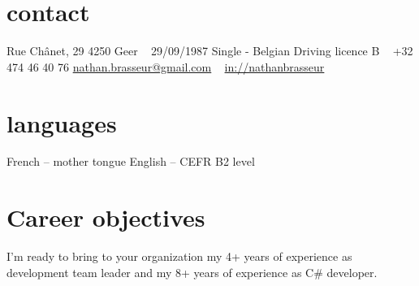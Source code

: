 \documentclass[a4paper]{cv-friggeri-x}
\begin{document}
%
%
%
\begin{aside} %
\section{contact}
\hfill Rue Chânet, 29
4250 Geer
~
29/09/1987
Single - Belgian
Driving licence B
~
\hfill +32 474 46 40 76
\hfill \href{mailto:nathan.brasseur@gmail.com}{nathan.brasseur@gmail.com}
~
\hfill \href{https://www.linkedin.com/in/nathanbrasseur/}{in://nathanbrasseur}\llogo 
~
\section{languages}
French -- mother tongue
English -- CEFR B2 level
\end{aside}
%
\section{Career objectives}
I'm ready to bring to your organization my 4+ years of experience as development team leader and my 8+ years of experience as C\# developer. 
%
%
\section{ }
\end{document}
